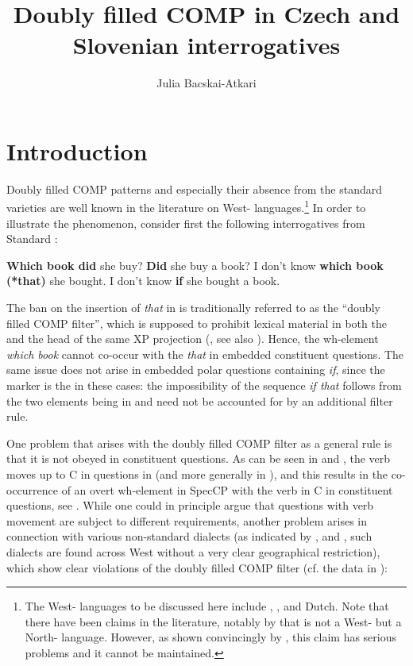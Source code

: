 \documentclass[output=paper,modfonts, hidelinks, newtxmath]{langscibook}
\title{Doubly filled COMP in Czech and Slovenian interrogatives}
\author{Julia Bacskai-Atkari\affiliation{University of Potsdam}}
\begin{document}
\maketitle
{}
\section{Introduction} 
Doubly filled COMP patterns and especially their absence from the standard varieties are well known in the literature on West- languages.\footnote{The West- languages to be discussed here include , , and Dutch. Note that there have been claims in the literature, notably by \citet{emondsfaarlund2014} that  is not a West- but a North- language. However, as shown convincingly by \citet{bechwalkden2016}, this claim has serious problems and it cannot be maintained.} In order to illustrate the phenomenon, consider first the following interrogatives from Standard :

\ea
	\ea \textbf{Which book did} she buy? \label{whichbookdid}
	\ex \textbf{Did} she buy a book? \label{did}
	\ex I don't know \textbf{which book (*that)} she bought. \label{whichbook}
	\ex I don't know \textbf{if} she bought a book. \label{if}
	\z
\z

\noindent The ban on the insertion of \textit{that} in  is traditionally referred to as the ``doubly filled COMP filter'', which is supposed to prohibit lexical material in both the  and the head of the same XP projection (\citealt[446]{chomskylasnik1977}, see also \citealt{koopman2000}). Hence, the wh-element \textit{which book} cannot co-occur with the  \textit{that} in embedded constituent questions. The same issue does not arise in embedded polar questions containing \textit{if}, since the  marker is the  in these cases: the impossibility of the sequence \textit{if that} follows from the two elements being in  and need not be accounted for by an additional filter rule.

One problem that arises with the doubly filled COMP filter as a general rule is that it is not obeyed in  constituent questions. As can be seen in  and , the verb moves up to C in  questions in  (and more generally in ), and this results in the co-occurrence of an overt wh-element in SpecCP with the verb in C in  constituent questions, see . While one could in principle argue that  questions with verb movement are subject to different requirements, another problem arises in connection with various non-standard dialects (as indicated by \citealt{vangelderen2009}, \citealt{bayer2004} and \citealt{bayerbrandner2008}, such dialects are found across West  without a very clear geographical restriction), which show clear violations of the doubly filled COMP filter (cf. the data in \citealt{baltin2010}):
\end{document}
